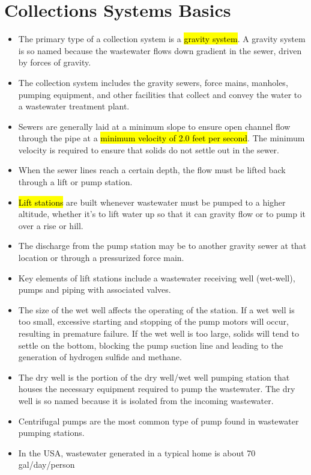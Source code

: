 \section{Collections Systems Basics}
	\begin{itemize}
\item The primary type of a collection system is a \hl{gravity system}. A gravity system is so named because the wastewater flows down gradient in the sewer, driven by forces of gravity. 
\item The collection system includes the gravity sewers, force mains, manholes, pumping equipment, and other facilities that collect and convey the water to a wastewater treatment plant. 
\item Sewers are generally laid at a minimum slope to ensure open channel flow through the pipe at a \hl{minimum velocity of 2.0 feet per second}. The minimum velocity is required to ensure that solids do not settle out in the sewer.  
\item When the sewer lines reach a certain depth, the flow must be lifted back through a lift or pump station.  
\item \hl{Lift stations} are built whenever wastewater must be pumped to a higher altitude, whether it's to lift water up so that it can gravity flow or to pump it over a rise or hill.  
\item The discharge from the pump station may be to another gravity sewer at that location or through a pressurized force main. 
\item Key elements of lift stations include a wastewater receiving well (wet-well), pumps and piping with associated valves.
\item The size of the wet well affects the operating of the station. If a wet well is too small, excessive starting and stopping of the pump motors will occur, resulting in premature failure. If the wet well is too large, solids will tend to settle on the bottom, blocking the pump suction line and leading to the generation of hydrogen sulfide and methane.
\item The dry well is the portion of the dry well/wet well pumping station that houses the necessary equipment required to pump the wastewater. The dry well is so named because it is isolated from the incoming wastewater.
\item Centrifugal pumps are the most common type of pump found in wastewater pumping stations. 
\item In the USA, wastewater generated in a typical home is about 70 gal/day/person
\end{itemize}

